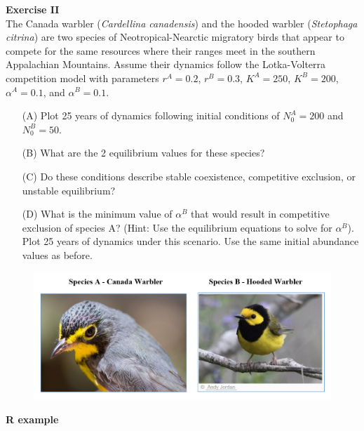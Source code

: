 \documentclass[12pt]{article}\usepackage[]{graphicx}\usepackage[]{xcolor}
\begin{document}
\clearpage

{\bf Exercise II \\}
The Canada warbler (\textit{Cardellina canadensis}) and the hooded
warbler ({\it Stetophaga citrina}) are two species of
Neotropical-Nearctic migratory birds that appear to compete for the
same resources where their ranges meet in the southern Appalachian
Mountains. Assume their dynamics follow the Lotka-Volterra competition
model with parameters $r^{A}=0.2$, $r^{B}=0.3$,
$K^{A}=250$, $K^{B}=200$, $\alpha^{A}=0.1$, and 
$\alpha^{B}=0.1$.   
\begin{enumerate}
  \item[(A)] Plot 25 years of dynamics following initial conditions of 
    $N_0^A = 200$ and $N_0^B=50$.  
  \item[(B)] What are the 2 equilibrium values for these species?
  \item[(C)] Do these conditions describe stable coexistence,
    competitive exclusion, or unstable equilibrium?  
  \item[(D)] What is the minimum value of $\alpha^B$ that would result in
    competitive exclusion of species A? (Hint: Use the equilibrium
    equations to solve for $\alpha^B$). Plot 25 years of dynamics under
    this scenario. Use the same initial abundance values as before. 
\end{enumerate}


\vspace{12pt}

\begin{figure}[h!]
  \centering
  \includegraphics[width=\textwidth]{cawa-howa}
  \label{fig:cawa-howa}
\end{figure}


\clearpage

{\bf R example \\}
\end{document}

